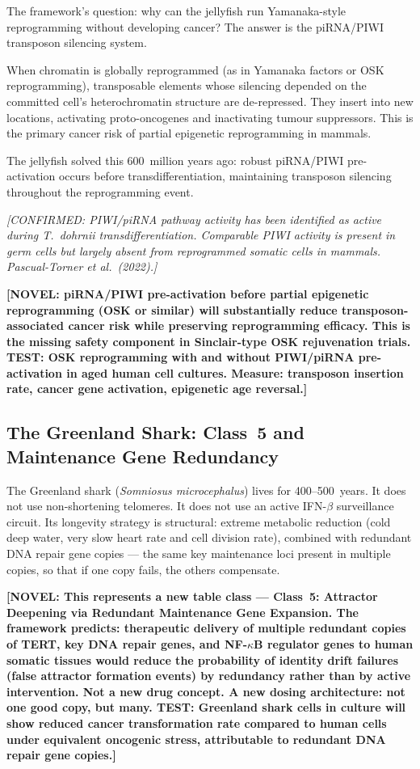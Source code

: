 \documentclass[12pt,a4paper]{article}
\newcommand{\novel}[1]{\textbf{[NOVEL: #1]}}
\newcommand{\confirmed}[1]{\textit{[CONFIRMED: #1]}}
\begin{document}
The framework's question: why can the jellyfish run Yamanaka-style
reprogramming without developing cancer? The answer is the piRNA/PIWI
transposon silencing system.

When chromatin is globally reprogrammed (as in Yamanaka factors or OSK
reprogramming), transposable elements whose silencing depended on the
committed cell's heterochromatin structure are de-repressed. They insert
into new locations, activating proto-oncogenes and inactivating tumour
suppressors. This is the primary cancer risk of partial epigenetic
reprogramming in mammals.

The jellyfish solved this 600~million years ago: robust piRNA/PIWI
pre-activation occurs before transdifferentiation, maintaining transposon
silencing throughout the reprogramming event.

\confirmed{PIWI/piRNA pathway activity has been identified as active during
\textit{T.\ dohrnii} transdifferentiation. Comparable PIWI activity is present
in germ cells but largely absent from reprogrammed somatic cells in mammals.
Pascual-Torner et al.\ (2022).}

\novel{piRNA/PIWI pre-activation before partial epigenetic reprogramming
(OSK or similar) will substantially reduce transposon-associated cancer risk
while preserving reprogramming efficacy. This is the missing safety component
in Sinclair-type OSK rejuvenation trials. TEST: OSK reprogramming with and
without PIWI/piRNA pre-activation in aged human cell cultures. Measure:
transposon insertion rate, cancer gene activation, epigenetic age reversal.}

\subsection{The Greenland Shark: Class~5 and Maintenance Gene Redundancy}

The Greenland shark (\textit{Somniosus microcephalus}) lives for
400--500~years. It does not use non-shortening telomeres. It does not use an
active IFN-$\beta$ surveillance circuit. Its longevity strategy is
structural: extreme metabolic reduction (cold deep water, very slow heart
rate and cell division rate), combined with redundant DNA repair gene copies
--- the same key maintenance loci present in multiple copies, so that if one
copy fails, the others compensate.

\novel{This represents a new table class --- Class~5: Attractor Deepening
via Redundant Maintenance Gene Expansion. The framework predicts: therapeutic
delivery of multiple redundant copies of TERT, key DNA repair genes, and
NF-$\kappa$B regulator genes to human somatic tissues would reduce the
probability of identity drift failures (false attractor formation events)
by redundancy rather than by active intervention. Not a new drug concept.
A new dosing architecture: not one good copy, but many. TEST: Greenland shark
cells in culture will show reduced cancer transformation rate compared to
human cells under equivalent oncogenic stress, attributable to redundant DNA
repair gene copies.}
\end{document}
